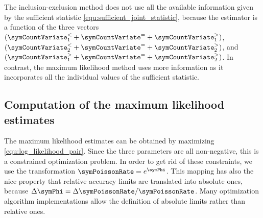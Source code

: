 \documentclass[a4paper]{scrartcl}
\begin{document}
The inclusion-exclusion method does not use all the available information given by the sufficient statistic \eqref{equ:sufficient_joint_statistic}, because the estimator is a function of the three vectors $(\boldsymbol\symCountVariate^{<}_{1} + \boldsymbol\symCountVariate^{=} + \boldsymbol\symCountVariate^{>}_{1})$, 
$(\boldsymbol\symCountVariate^{<}_{2} + \boldsymbol\symCountVariate^{=} + \boldsymbol\symCountVariate^{>}_{2})$, and 
$(\boldsymbol\symCountVariate^{>}_{1} + \boldsymbol\symCountVariate^{=} + \boldsymbol\symCountVariate^{>}_{2})$. In contrast, the maximum likelihood method uses more information as it incorporates all the individual values of the sufficient statistic.

\subsection{Computation of the maximum likelihood estimates}
The maximum likelihood estimates can be obtained by maximizing \eqref{equ:log_likelihood_pair}. Since the three parameters are all non-negative, this is a constrained optimization problem. In order to get rid of these constraints, we use the transformation $\symPoissonRate=e^{\symPhi}$. This mapping has also the nice property that relative accuracy limits are translated into absolute ones, because $\Delta\symPhi = \Delta\symPoissonRate/\symPoissonRate$. Many optimization algorithm implementations allow the definition of absolute limits rather than relative ones.
\end{document}
